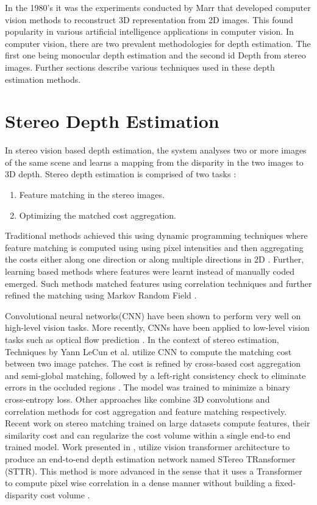 In the 1980's it was the experiments conducted by Marr \cite{marr1979computational} that developed computer vision methods to reconstruct 3D representation from 2D images. This found popularity in various artificial intelligence applications in computer vision. In computer vision, there are two prevalent methodologies for depth estimation. The first one being monocular depth estimation and the second id Depth from stereo images. Further sections describe various techniques used in these depth estimation methods. 

\section{Stereo Depth Estimation} 
\label{sec:related:sec2}
In stereo vision based depth estimation, the system analyses two or more images of the same scene and learns a mapping from the disparity in the two images to 3D depth. Stereo depth estimation is comprised of two tasks \cite{li2021revisiting}:
\begin{enumerate}
	\item Feature matching in the stereo images.
	\item Optimizing the matched cost aggregation.
\end{enumerate}
Traditional methods achieved this using dynamic programming techniques where feature matching is computed using using pixel intensities and then aggregating the costs either along one direction or along multiple directions in 2D \cite{li2021revisiting}. 
Further, learning based methods where features were learnt instead of manually coded emerged. Such methods matched features using correlation techniques and further refined the matching using Markov Random Field \cite{2020}.


Convolutional neural networks(CNN) have been shown
to perform very well on high-level vision tasks. More recently, CNNs have been applied to low-level
vision tasks such as optical flow prediction \cite{Luo_2016_CVPR}. In the context of stereo estimation, Techniques by Yann LeCun et al. \cite{2015} utilize CNN to compute the
matching cost between two image patches. The cost is refined by cross-based cost aggregation and semi-global matching, followed by a left-right consistency check to eliminate errors in the occluded regions \cite{2015}. The  model was trained to minimize a binary cross-entropy loss\cite{Luo_2016_CVPR}.
Other approaches like \cite{guo2019group} combine 3D convolutions and correlation methods for cost aggregation and feature matching respectively.
Recent work on stereo matching trained on large datasets  compute features, their similarity cost and can regularize the cost volume within a single end-to end trained model. Work presented in \cite{li2021revisiting}, utilize vision transformer architecture to produce an end-to-end depth estimation network named STereo TRansformer (STTR). This method is more advanced in the sense that it uses a Transformer to compute pixel wise correlation in a dense manner without building a fixed-disparity cost volume \cite{li2021revisiting}.


